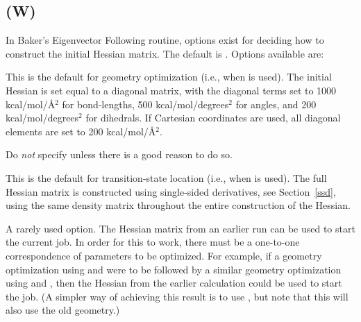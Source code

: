 \subsection*{ (W)}
In Baker's Eigenvector Following routine, options exist for deciding
how to construct the initial Hessian matrix.  The default is .
Options available are:
\begin{description}
\item{}

This is the default for geometry optimization (i.e., when  is used).
The initial Hessian is set equal to a diagonal matrix, with the diagonal terms
set to 1000 kcal/mol/\AA $^2$ for bond-lengths, 500 kcal/mol/degrees$^2$ for angles,
and 200 kcal/mol/degrees$^2$ for dihedrals.  If Cartesian coordinates are used,
all diagonal elements are set to 200 kcal/mol/\AA $^2$.

Do {\em not} specify  unless there is a good reason to do so.

\item{}

This is the default for transition-state location (i.e., when  is used).
The full Hessian matrix is constructed using single-sided derivatives, see
Section~\ref{ssd}, using the same density matrix throughout the entire
construction of the Hessian.

\item{}

A rarely used option.  The Hessian matrix from an earlier run can be used
to start the current job.  In order for this to work, there must be a one-to-one
correspondence of parameters to be optimized.  For example, if a geometry
optimization using  and  were to be followed by a similar
geometry optimization using  and , then the Hessian from the
earlier calculation could be used to start the  job.
(A simpler way of achieving this result is to use , but note that
this will also use the old geometry.)

\end{description}


